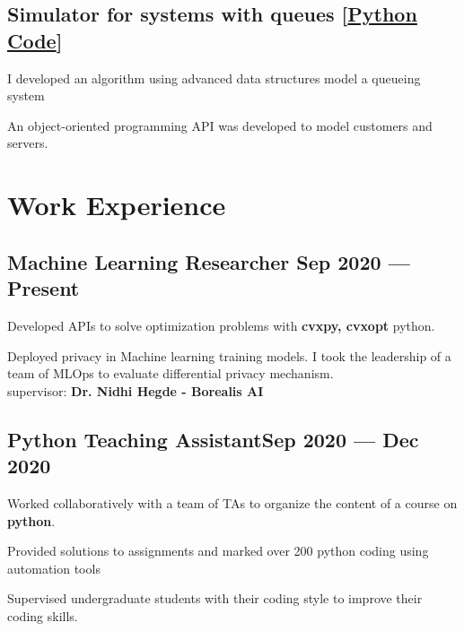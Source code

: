 \documentclass[letter,11pt]{article}
\begin{document}
\subsection{Simulator for systems with queues [\href{https://github.com/Hadi2525/queueing_theory}{Python Code}]}
\begin{zitemize}
	\item I developed an algorithm using advanced data structures model a queueing system
	\item An object-oriented programming API was developed to model customers and servers.
\end{zitemize}

\section{Work Experience}
\subsection{{Machine Learning Researcher \hfill Sep 2020 --- Present}}
\begin{zitemize}
	\item Developed APIs to solve optimization problems with \textbf{cvxpy, cvxopt} python.\\
	\item Deployed privacy in Machine learning training models. I took the leadership of a team of MLOps to evaluate differential privacy mechanism.\\
	supervisor: \textbf{Dr. Nidhi Hegde - Borealis AI}
	\end{zitemize}

\subsection{{Python Teaching Assistant\hfill Sep 2020 --- Dec 2020}}
\begin{zitemize}
	\item Worked collaboratively with a team of TAs to organize the content of a course on \textbf{python}.
	\item Provided solutions to assignments and marked over 200 python coding  using automation tools
	\item Supervised undergraduate students with their coding style to improve their coding skills.
\end{zitemize}
\end{document}
